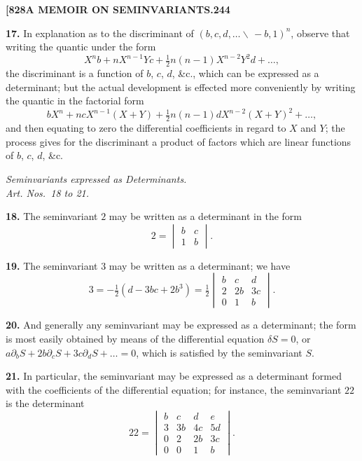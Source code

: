 \documentclass[12pt,a4paper]{article}
\theoremstyle{definition}
\begin{document}
\newpage
\setcounter{page}{244}

\noindent\textbf{[828}\hfill\textbf{A MEMOIR ON SEMINVARIANTS.}\hfill\textbf{244}

\bigskip

\noindent\textbf{17.} In explanation as to the discriminant of $(b, c, d, \dots \!\!\!\backslash\, -b, 1)^n$, observe that writing the quantic under the form
\[
X^n b + nX^{n-1}Y c + \tfrac{1}{2}n(n-1)X^{n-2}Y^2 d + \dots,
\]
the discriminant is a function of $b$, $c$, $d$, \&c., which can be expressed as a determinant; but the actual development is effected more conveniently by writing the quantic in the factorial form
\[
bX^n + ncX^{n-1}(X+Y) + \tfrac{1}{2}n(n-1)dX^{n-2}(X+Y)^2 + \dots,
\]
and then equating to zero the differential coefficients in regard to $X$ and $Y$; the process gives for the discriminant a product of factors which are linear functions of $b$, $c$, $d$, \&c.

\begin{center}
\textit{Seminvariants expressed as Determinants.}\\
\textit{Art. Nos.~18 to 21.}
\end{center}

\noindent\textbf{18.} The seminvariant $2$ may be written as a determinant in the form
\[
2 = \begin{vmatrix} b & c \\ 1 & b \end{vmatrix}.
\]

\noindent\textbf{19.} The seminvariant $3$ may be written as a determinant; we have
\[
3 = -\tfrac{1}{2}(d - 3bc + 2b^3) = \tfrac{1}{2}\begin{vmatrix} b & c & d \\ 2 & 2b & 3c \\ 0 & 1 & b \end{vmatrix}.
\]

\noindent\textbf{20.} And generally any seminvariant may be expressed as a determinant; the form is most easily obtained by means of the differential equation $\delta S = 0$, or $a\partial_b S + 2b\partial_c S + 3c\partial_d S + \dots = 0$, which is satisfied by the seminvariant $S$.

\noindent\textbf{21.} In particular, the seminvariant may be expressed as a determinant formed with the coefficients of the differential equation; for instance, the seminvariant $22$ is the determinant
\[
22 = \begin{vmatrix} b & c & d & e \\ 3 & 3b & 4c & 5d \\ 0 & 2 & 2b & 3c \\ 0 & 0 & 1 & b \end{vmatrix}.
\]
\end{document}
